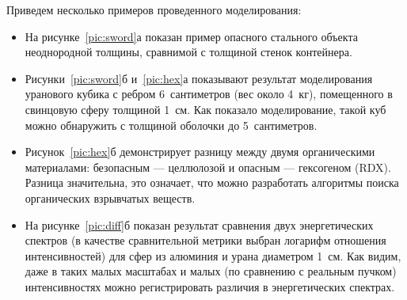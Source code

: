 \documentclass[a4paper]{panl}
\begin{document}
Приведем несколько примеров проведенного моделирования:
   \begin{itemize}
        \item На рисунке~\ref{pic:sword}а показан пример опасного стального объекта неоднородной толщины, сравнимой с толщиной стенок контейнера.
        \item Рисунки~\ref{pic:sword}б и~\ref{pic:hex}а показывают результат моделирования уранового кубика с ребром 6~сантиметров (вес около 4~кг), помещенного в свинцовую сферу толщиной 1~см. Как показало моделирование, такой куб можно обнаружить с толщиной оболочки до 5~сантиметров.
        \item Рисунок~\ref{pic:hex}б демонстрирует разницу между двумя органическими материалами: безопасным --- целлюлозой и опасным --- гексогеном (RDX). Разница значительна, это означает, что можно разработать алгоритмы поиска органических взрывчатых веществ.
        \item На рисунке~\ref{pic:diff}б показан результат сравнения двух энергетических спектров (в качестве сравнительной метрики выбран логарифм отношения интенсивностей) для сфер из алюминия и урана диаметром 1~см. Как видим, даже в таких малых масштабах и малых (по сравнению с реальным пучком) интенсивностях можно регистрировать различия в энергетических спектрах.
    \end{itemize}
\end{document}
